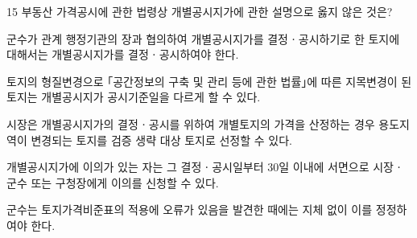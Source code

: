 \begin{question}{15}
부동산 가격공시에 관한 법령상 개별공시지가에 관한 설명으로 옳지 않은 것은?
\begin{choices}
  \item 군수가 관계 행정기관의 장과 협의하여 개별공시지가를 결정ㆍ공시하기로 한 토지에 대해서는 개별공시지가를 결정ㆍ공시하여야 한다.
  \item 토지의 형질변경으로 ｢공간정보의 구축 및 관리 등에 관한 법률｣에 따른 지목변경이 된 토지는 개별공시지가 공시기준일을 다르게 할 수 있다.
  \item 시장은 개별공시지가의 결정ㆍ공시를 위하여 개별토지의 가격을 산정하는 경우 용도지역이 변경되는 토지를 검증 생략 대상 토지로 선정할 수 있다.
  \item 개별공시지가에 이의가 있는 자는 그 결정ㆍ공시일부터 30일 이내에 서면으로 시장ㆍ군수 또는 구청장에게 이의를 신청할 수 있다.
  \item 군수는 토지가격비준표의 적용에 오류가 있음을 발견한 때에는 지체 없이 이를 정정하여야 한다.
\end{choices}
\end{question}
